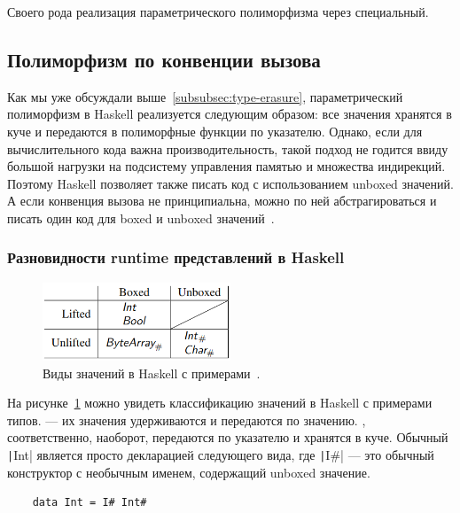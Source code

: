 Своего рода реализация параметрического полиморфизма через специальный. %

\subsection{Полиморфизм по конвенции вызова} \label{subsec:representation-polymorphism}

Как мы уже обсуждали выше~\ref{subsubsec:type-erasure}, параметрический полиморфизм в Haskell реализуется следующим образом: все значения хранятся в куче и передаются в полиморфные функции по указателю.
Однако, если для вычислительного кода важна производительность, такой подход не годится ввиду большой нагрузки на подсистему управления памятью и множества индирекций.
Поэтому Haskell позволяет также писать код с использованием unboxed значений.
А если конвенция вызова не принципиальна, можно по ней абстрагироваться и писать один код для boxed и unboxed значений~\cite{eisenberg2017levity}.

\subsubsection{Разновидности runtime представлений в Haskell}

\begin{figure}[h]
    \centering
    \includegraphics[width=0.5\textwidth]{figs/haskell-value-kinds}
    \caption{Виды значений в Haskell с примерами~\cite{eisenberg2017levity}.}
    \label{fig:haskell-value-kinds}
\end{figure}

На рисунке~\ref{fig:haskell-value-kinds} можно увидеть классификацию значений в Haskell с примерами типов.
 --- их значения удерживаются и передаются по значению.
, соответственно, наоборот, передаются по указателю и хранятся в куче.
Обычный \texttt|Int| является просто декларацией следующего вида, где \texttt|I#| --- это обычный конструктор с необычным именем, содержащий unboxed значение.
\begin{verbatim}
    data Int = I# Int#
\end{verbatim}

